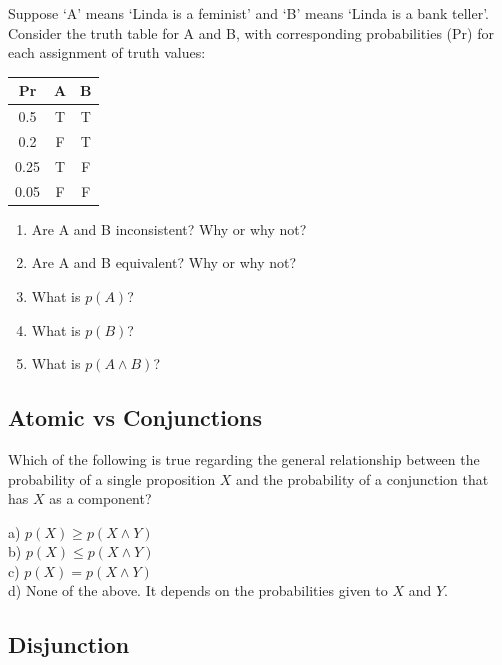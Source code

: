 \documentclass[]{tufte-book}
\begin{document}
Suppose `A' means `Linda is a feminist' and `B' means `Linda is a bank teller'. Consider the truth table for A and B, with corresponding probabilities (Pr) for each assignment of truth values:

\begin{longtable}[]{@{}ccc@{}}
\toprule
Pr & A & B\tabularnewline
\midrule
\endhead
0.5 & T & T\tabularnewline
0.2 & F & T\tabularnewline
0.25 & T & F\tabularnewline
0.05 & F & F\tabularnewline
\bottomrule
\end{longtable}

\begin{enumerate}
\def\labelenumi{\arabic{enumi}.}
\item
  Are A and B inconsistent? Why or why not?
\item
  Are A and B equivalent? Why or why not?
\item
  What is \(p(A)\)?
\item
  What is \(p(B)\)?
\item
  What is \(p(A\wedge B)\)?
\end{enumerate}

\hypertarget{atomic-vs-conjunctions}{%
\subsection{Atomic vs Conjunctions}\label{atomic-vs-conjunctions}}

Which of the following is true regarding the general relationship between the probability of a single proposition \(X\) and the probability of a conjunction that has \(X\) as a component?

a) \(p(X)\geq p(X\wedge Y)\)\\
b) \(p(X)\leq p(X\wedge Y)\)\\
\hspace*{0.333em}\hspace*{0.333em}\hspace*{0.333em}c) \(p(X) = p(X\wedge Y)\)\\
\hspace*{0.333em}\hspace*{0.333em}\hspace*{0.333em}d) None of the above. It depends on the probabilities given to \(X\) and \(Y\).

\hypertarget{disjunction}{%
\subsection{Disjunction}\label{disjunction}}
\end{document}
